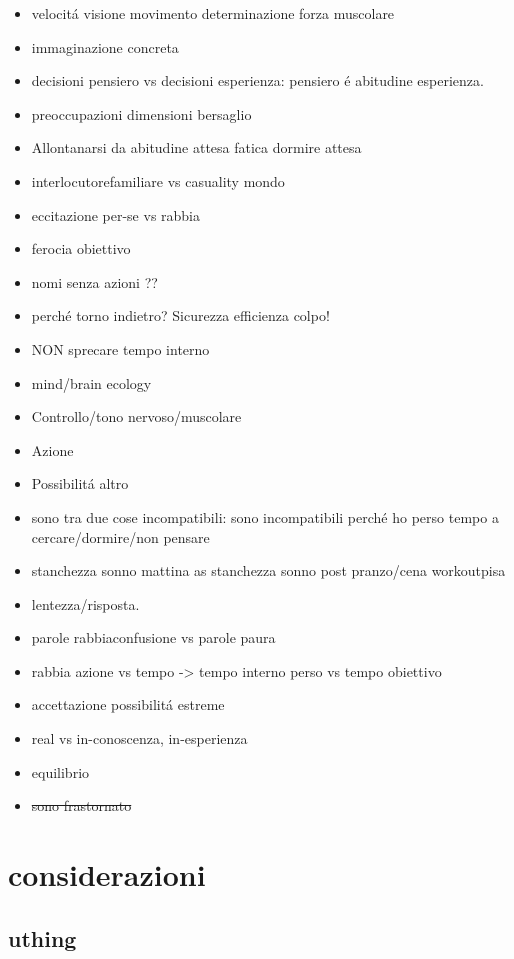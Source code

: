 \begin{itemize}
\item velocit\'a visione  movimento determinazione forza muscolare 
\item immaginazione concreta 
\item decisioni pensiero vs decisioni esperienza: pensiero \'e abitudine esperienza.
\item preoccupazioni dimensioni bersaglio
\item Allontanarsi da abitudine attesa fatica dormire attesa
\item interlocutorefamiliare vs casuality mondo
\item eccitazione per-se vs rabbia
\item ferocia obiettivo
\item nomi senza azioni ??
\item perch\'e torno indietro? Sicurezza efficienza colpo!
\item NON sprecare tempo interno
\item mind/brain ecology
\item Controllo/tono nervoso/muscolare
\item Azione
\item Possibilit\'a altro
\item sono  tra due cose incompatibili: sono incompatibili perch\'e ho perso tempo a cercare/dormire/non pensare
\item stanchezza sonno mattina as stanchezza sonno post pranzo/cena workoutpisa
\item lentezza/risposta.
\item parole rabbiaconfusione vs parole paura
\item rabbia azione vs tempo -> tempo interno perso vs tempo obiettivo
\item accettazione possibilit\'a estreme
\item real vs in-conoscenza, in-esperienza
\item equilibrio
\item \sout{sono frastornato}
\end{itemize}

\section{considerazioni}

\subsection{uthing}

